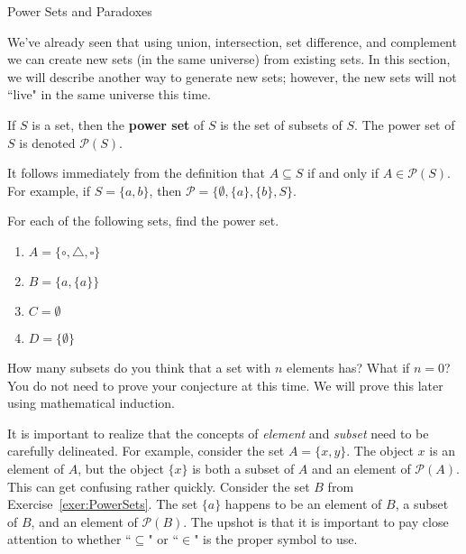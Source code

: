 \begin{section}{Power Sets and Paradoxes}\label{sec:PowerSets}

We've already seen that using union, intersection, set difference, and complement we can create new sets (in the same universe) from existing sets.  In this section, we will describe another way to generate new sets; however, the new sets will not ``live" in the same universe this time.

\begin{definition}
If $S$ is a set, then the \textbf{power set} of $S$ is the set of subsets of $S$.  The power set of $S$ is denoted $\boxed{\mathcal{P}(S)}$.
\end{definition}

It follows immediately from the definition that $A\subseteq S$ if and only if $A\in\mathcal{P}(S)$.  For example, if $S=\{a,b\}$, then $\mathcal{P}=\{\emptyset, \{a\}, \{b\}, S\}$.

\begin{exercise}\label{exer:PowerSets}
For each of the following sets, find the power set.
\begin{multicols}{2}
\begin{enumerate}[label=\textrm{(\alph*)}]
\item $A=\{\circ, \triangle, \square\}$
\item $B=\{a,\{a\}\}$
\item $C=\emptyset$
\item $D=\{\emptyset\}$
\end{enumerate}
\end{multicols}
\end{exercise}

\begin{conjecture}\label{conjecture:PowerSets}
How many subsets do you think that a set with $n$ elements has?  What if $n=0$?  You do not need to prove your conjecture at this time.  We will prove this later using mathematical induction.
\end{conjecture}


It is important to realize that the concepts of \emph{element} and \emph{subset} need to be carefully delineated.  For example, consider the set $A=\{x,y\}$.  The object $x$ is an element of $A$, but the object $\{x\}$ is both a subset of $A$ and an element of $\mathcal{P}(A)$.  This can get confusing rather quickly.  Consider the set $B$ from Exercise~\ref{exer:PowerSets}.  The set $\{a\}$ happens to be an element of $B$, a subset of $B$, and an element of  $\mathcal{P}(B)$. The upshot is that it is important to pay close attention to whether ``$\subseteq$" or ``$\in$" is the proper symbol to use.


\end{section}
